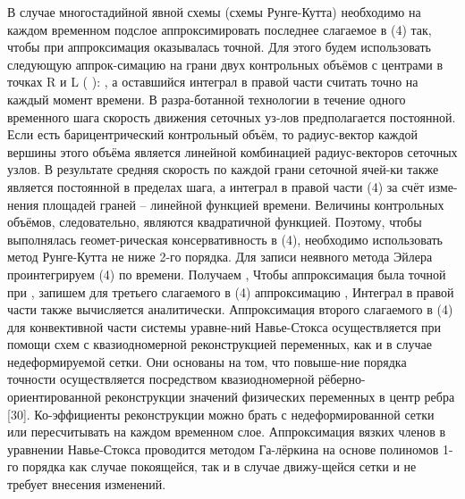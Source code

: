 В случае многостадийной явной схемы (схемы Рунге-Кутта) необходимо на каждом временном подслое аппроксимировать последнее слагаемое в (4) так, чтобы при   аппроксимация оказывалась точной. Для этого будем использовать следующую аппрок-симацию на грани двух контрольных объёмов с центрами в точках R и L ( ):
,
а оставшийся интеграл в правой части считать точно на каждый момент времени. В разра-ботанной технологии в течение одного временного шага скорость движения сеточных уз-лов предполагается постоянной. Если   есть барицентрический  контрольный объём, то радиус-вектор каждой вершины этого объёма является линейной комбинацией радиус-векторов сеточных узлов. В результате средняя скорость по каждой грани сеточной ячей-ки также является постоянной в пределах шага, а интеграл в правой части (4) за счёт изме-нения площадей граней – линейной функцией времени. Величины контрольных объёмов, следовательно, являются квадратичной функцией. Поэтому, чтобы выполнялась геомет-рическая консервативность в (4), необходимо использовать метод Рунге-Кутта не ниже 2-го порядка.
Для записи неявного метода Эйлера проинтегрируем (4) по времени. Получаем
,
Чтобы аппроксимация была точной при  , запишем для третьего слагаемого в (4) аппроксимацию
,
Интеграл в правой части также вычисляется аналитически.
Аппроксимация второго слагаемого в (4) для конвективной части системы уравне-ний Навье-Стокса осуществляется при помощи схем с квазиодномерной реконструкцией переменных, как и в случае недеформируемой сетки. Они основаны на том, что повыше-ние порядка точности осуществляется посредством квазиодномерной рёберно-ориентированной реконструкции значений физических переменных в центр ребра [30]. Ко-эффициенты реконструкции можно брать с недеформированной сетки или пересчитывать на каждом временном слое. 
Аппроксимация вязких членов в уравнении Навье-Стокса проводится методом Га-лёркина на основе полиномов 1-го порядка как случае покоящейся, так и в случае движу-щейся сетки и не требует внесения изменений. 




